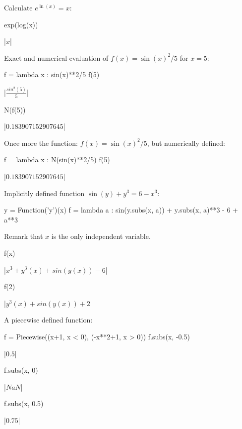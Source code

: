 \begin{example}
Calculate $e^{\ln(x)}=x$:

\begin{pyin}
exp(log(x))
\end{pyin}
\begin{pyout}
|$x$|
\end{pyout}

Exact and numerical evaluation of $f(x) = \sin(x)^2/5$ for $x = 5$:
\begin{pyin}
	f = lambda x : sin(x)**2/5
	f(5)
\end{pyin}
\begin{pyout}
|$\frac{sin^2(5)}{5}$|
\end{pyout}
\begin{pyin}
	N(f(5))
\end{pyin}
\begin{pyout}
|$0.183907152907645$|
\end{pyout}
Once more the function: $f(x) = \sin(x)^2/5$, but numerically defined:

\begin{pyin}
	f = lambda x : N(sin(x)**2/5)
	f(5)
\end{pyin}
\begin{pyout}
|$0.183907152907645$|
\end{pyout}

	Implicitly defined function $\sin(y) + y^3 = 6-x^3:$
\begin{pyin}
    y = Function('y')(x)
    f = lambda a : sin(y.subs(x, a)) + y.subs(x, a)**3 - 6 + a**3
\end{pyin}
	Remark that $x$ is the only independent variable.
\begin{pyin}
    f(x)
\end{pyin}
\begin{pyout}
    |$x^3 + y^3(x) + sin(y(x)) - 6$|
\end{pyout}
\begin{pyin}
    f(2)
\end{pyin}
\begin{pyout}
    |$y^3(x) + sin(y(x)) + 2$|
\end{pyout}	
	A piecewise defined function:
\begin{pyin}
    f = Piecewise((x+1, x < 0), (-x**2+1, x > 0))
    f.subs(x, -0.5)
\end{pyin}
\begin{pyout}
    |$0.5$|
\end{pyout}
\begin{pyin}
    f.subs(x, 0)
\end{pyin}
\begin{pyout}
    |$NaN$|
\end{pyout}
\begin{pyin}
    f.subs(x, 0.5)
\end{pyin}
\begin{pyout}
    |$0.75$|
\end{pyout}
\end{example}

